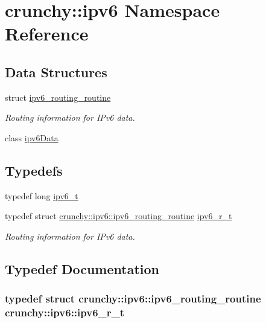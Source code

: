 \hypertarget{namespacecrunchy_1_1ipv6}{}\section{crunchy\+:\+:ipv6 Namespace Reference}
\label{namespacecrunchy_1_1ipv6}
\subsection*{Data Structures}
\begin{DoxyCompactItemize}
\item 
struct \hyperlink{structcrunchy_1_1ipv6_1_1ipv6__routing__routine}{ipv6\+\_\+routing\+\_\+routine}
\begin{DoxyCompactList}\small\item\em Routing information for I\+Pv6 data. \end{DoxyCompactList}\item 
class \hyperlink{classcrunchy_1_1ipv6_1_1ipv6_data}{ipv6\+Data}
\end{DoxyCompactItemize}
\subsection*{Typedefs}
\begin{DoxyCompactItemize}
\item 
typedef long \hyperlink{namespacecrunchy_1_1ipv6_ae8143b1c348e1081a461d0cc25dea6a4}{ipv6\+\_\+t}
\item 
typedef struct \hyperlink{structcrunchy_1_1ipv6_1_1ipv6__routing__routine}{crunchy\+::ipv6\+::ipv6\+\_\+routing\+\_\+routine} \hyperlink{namespacecrunchy_1_1ipv6_acac09029f9e7e505b959a09fae745f81}{ipv6\+\_\+r\+\_\+t}
\begin{DoxyCompactList}\small\item\em Routing information for I\+Pv6 data. \end{DoxyCompactList}\end{DoxyCompactItemize}


\subsection{Typedef Documentation}
\hypertarget{namespacecrunchy_1_1ipv6_acac09029f9e7e505b959a09fae745f81}{}
\subsubsection[{ipv6\+\_\+r\+\_\+t}]{\setlength{\rightskip}{0pt plus 5cm}typedef struct {\bf crunchy\+::ipv6\+::ipv6\+\_\+routing\+\_\+routine}  {\bf crunchy\+::ipv6\+::ipv6\+\_\+r\+\_\+t}}\label{namespacecrunchy_1_1ipv6_acac09029f9e7e505b959a09fae745f81}


